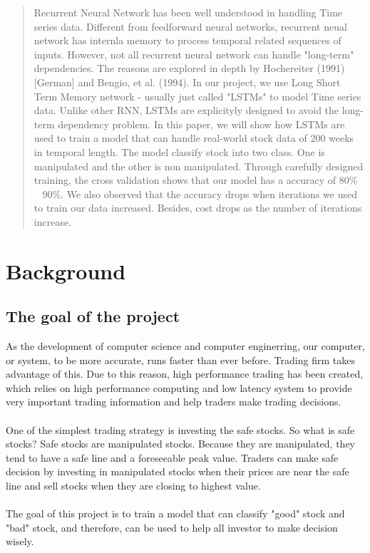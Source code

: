 \documentclass[12pt]{article}
\begin{document}
\maketitle


\begin{abstract}
Recurrent Neural Network has been well understood in handling 
Time series data. Different from feedforward neural networks, 
recurrent neual network has internla memory to process temporal
related sequences of inputs. However, not all recurrent neural network
can handle "long-term" dependencies. The reasons are explored in depth
by Hochereiter (1991) [German] and Bengio, et al. (1994). In our project, we 
use Long Short Term Memory network - usually just called "LSTMs" to model
Time series data. Unlike other RNN, LSTMs are explicityly designed to avoid the 
long-term dependency problem. In this paper, we will show how LSTMs are used 
to train a model that can handle real-world stock data of 200 weeks in temporal length. 
The model classify stock into two class. One is manipulated and the other is 
non manipulated. Through carefully designed training, the cross validation 
shows that our model has a accuracy of 80\% ~ 90\%. We also observed that 
the accuracy drops when iterations we used to train our data increased. 
Besides, cost drops as the number of iterations increase. 
\end{abstract}



\section{Background}

\subsection{The goal of the project}
As the development of computer science and computer enginerring, our computer, or 
system, to be more accurate, runs faster than ever before. Trading firm takes advantage of 
this. Due to this reason, high performance trading has been created, which relies on high 
performance computing and low latency system to provide very important trading information 
and help traders make trading decisions. \\\\
One of the simplest trading strategy is investing the safe stocks. So what is safe stocks? 
Safe stocks are manipulated stocks. Because they are manipulated, they tend to have a safe line 
and a foreseeable peak value. Traders can make safe decision by investing in manipulated stocks 
when their prices are near the safe line and sell stocks when they are closing to highest value. \\\\
The goal of this project is to train a model that can classify "good" stock and "bad" stock, and therefore, 
can be used to help all investor to make decision wisely.
\end{document}
